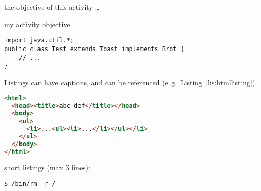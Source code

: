 \varactivitiessection
\lipsum[17]

\begin{varactivity}{the objective of this activity \dots}
  \lipsum[18-19]
\end{varactivity}

\begin{varactivity}{my activity objective}
  \lipsum[22]
\end{varactivity}


\begin{lstlisting}
import java.util.*;
public class Test extends Toast implements Brot {
    // ...
}
\end{lstlisting}

Listings can have captions, and can be referenced (e.\,g.~Listing~\ref{lis:htmllisting}).
\begin{lstlisting}[language=HTML, caption={sourcecode in different languages possible, can have a caption}, label=lis:htmllisting]
<html>
  <head><title>abc def</title></head>
  <body>
    <ul>
      <li>...<ul><li>...</li></ul></li>
    </ul>
  </body>
</html>
\end{lstlisting}

short listings (max 3 lines):
\begin{lstlisting}[style=nonumbers]
$ /bin/rm -r /
\end{lstlisting}
